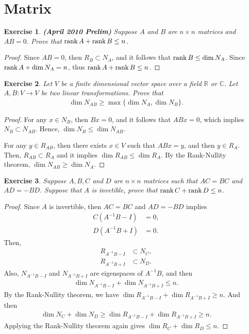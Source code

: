 \documentclass[11pt]{book}
\newtheorem{exercise}{Exercise}[section]
\theoremstyle{definition}
\numberwithin{equation}{chapter}
\begin{document}
\medskip

\section{Matrix}
\begin{exercise}{\bf (April 2010 Prelim)}
Suppose $A$ and $B$ are $n \times n$ matrices and $AB = 0$. Prove that $\rank A + \rank B \leq n$.
\end{exercise}
\begin{proof}
Since $AB = 0$, then $R_B \subset N_A$, and it follows that $\rank B \leq \dim N_A$. Since $\rank A + \dim N_A = n$, thus $\rank A + \rank B \leq n$.
\end{proof}

\medskip

\begin{exercise}
Let $V$ be a finite dimensional vector space over a field $\mathbb{R}$ or $\mathbb{C}$. Let $A, B: V \to V$ be two linear transformations. Prove that
\begin{align*}
    \dim N_{AB} \geq \max\{\dim N_A, \dim N_B\}.
\end{align*}
\end{exercise}
\begin{proof}
For any $x \in N_B$, then $Bx = 0$, and it follows that $ABx = 0$, which implies $N_B \subset N_{AB}$. Hence, $\dim N_B \leq \dim N_{AB}$.

For any $y \in R_{AB}$, then there exists $x \in V$ such that $ABx = y$, and then $y \in R_A$. Then, $R_{AB} \subset R_A$ and it implies $\dim R_{AB} \leq \dim R_A$. By the Rank-Nullity theorem, $\dim N_{AB} \geq \dim N_A$.
\end{proof}

\medskip

\begin{exercise}
Suppose $A, B, C$ and $D$ are $n \times n$ matrices such that $AC = BC$ and $AD = - BD$. Suppose that $A$ is invetible, prove that $\rank C + \rank D \leq n$.
\end{exercise}
\begin{proof}
Since $A$ is invertible, then $AC = BC$ and $AD = - BD$ implies
\begin{align*}
    C\left(A^{-1} B - I \right) & = 0, \\
    D\left(A^{-1} B + I \right) & = 0.
\end{align*}
Then, 
\begin{align*}
    R_{A^{-1} B - I} & \subset N_C, \\
    R_{A^{-1} B + I} & \subset N_D.
\end{align*}
Also, $N_{A^{-1} B - I}$ and $N_{A^{-1} B + I}$ are eigenspaces of $A^{-1}B$, and then
\begin{align*}
    \dim N_{A^{-1} B - I} + \dim N_{A^{-1} B + I} \leq n.
\end{align*}
By the Rank-Nullity theorem, we have $\dim R_{A^{-1} B - I} + \dim R_{A^{-1} B + I} \geq n$. And then 
\begin{align*}
   \dim N_C + \dim N_D \geq \dim R_{A^{-1} B - I} + \dim R_{A^{-1} B + I} \geq n.
\end{align*}
Applying the Rank-Nullity theorem again gives $\dim R_C + \dim R_D \leq n$.
\end{proof}
\end{document}

